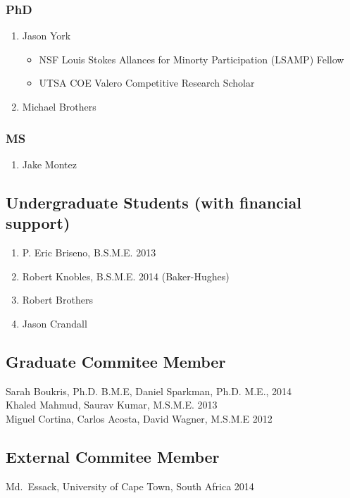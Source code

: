\subsubsection*{PhD}
\begin{enumerate}
  \item Jason York
      \begin{itemize}
        \item NSF Louis Stokes Allances for Minorty Participation (LSAMP) Fellow
        \item UTSA COE Valero Competitive Research Scholar
      \end{itemize}
  \item Michael Brothers
\end{enumerate}

\subsubsection*{MS}
\begin{enumerate}
  \item Jake Montez
\end{enumerate}

\subsection*{Undergraduate Students (with financial support)}
  \begin{enumerate}
    \item P. Eric Briseno, B.S.M.E. 2013
    \item Robert Knobles, B.S.M.E. 2014 (Baker-Hughes)
    \item Robert Brothers
    \item Jason Crandall
  \end{enumerate}

\subsection*{Graduate Commitee Member}
Sarah Boukris, Ph.D. B.M.E, Daniel Sparkman, Ph.D. M.E., 2014 \\
Khaled Mahmud, Saurav Kumar, M.S.M.E. 2013 \\
Miguel Cortina, Carlos Acosta, David Wagner, M.S.M.E 2012 
\subsection*{External Commitee Member}
Md.~Essack, University of Cape Town, South Africa 2014


